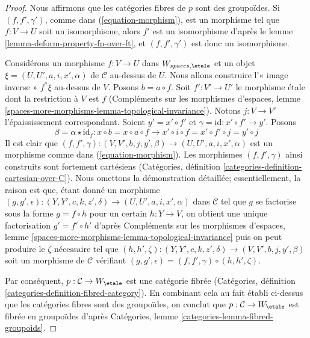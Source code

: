 \begin{proof}
Nous affirmons que les catégories fibres de $p$ sont des groupoïdes.
Si $(f, f', \gamma')$, comme dans (\ref{equation-morphism}),
est un morphisme tel que $f : V \to U$ soit un isomorphisme, alors
$f'$ est un isomorphisme d'après le lemme \ref{lemma-deform-property-fp-over-ft},
et $(f, f', \gamma')$ est donc un isomorphisme.

\medskip\noindent
Considérons un morphisme $f : V \to U$ dans $W_{spaces, \etale}$
et un objet $\xi = (U, U', a, i, x', \alpha)$
de $\mathcal{C}$ au-dessus de $U$. Nous allons construire l'« image inverse »
$f^*\xi$ au-dessus de $V$.
Posons $b = a \circ f$. Soit $f' : V' \to U'$ le morphisme \'etale
dont la restriction à $V$ est $f$ (Compléments sur les morphismes d'espaces,
lemme \ref{spaces-more-morphisms-lemma-topological-invariance}).
Notons $j : V \to V'$ l'épaississement correspondant.
Soient $y' = x' \circ f'$ et $\gamma = \text{id} : x' \circ f' \to y'$.
Posons
$$
\beta = \alpha \star \text{id}_f :
x \circ b = x \circ a \circ f \to
x' \circ i \circ f = x' \circ f' \circ j = y' \circ j
$$
Il est clair que $(f, f', \gamma) : (V, V', b, j, y', \beta) \to
(U, U', a, i, x', \alpha)$ est un morphisme comme dans
(\ref{equation-morphism}). Les morphismes $(f, f', \gamma)$
ainsi construits sont fortement cartésiens
(Catégories, définition \ref{categories-definition-cartesian-over-C}).
Nous omettons la démonstration détaillée; essentiellement, la raison est que,
étant donné un morphisme
$(g, g', \epsilon) : (Y, Y', c, k, z', \delta) \to (U, U', a, i, x', \alpha)$
dans $\mathcal{C}$ tel que $g$ se factorise sous la forme $g = f \circ h$ pour un certain
$h : Y \to V$, on obtient une unique factorisation $g' = f' \circ h'$
d'après Compléments sur les morphismes d'espaces,
lemme \ref{spaces-more-morphisms-lemma-topological-invariance}
puis on peut produire le $\zeta$ nécessaire tel que
$(h, h', \zeta) :  (Y, Y', c, k, z', \delta) \to
(V, V', b, j, y', \beta)$ soit un morphisme de $\mathcal{C}$
vérifiant $(g, g', \epsilon) = (f, f', \gamma) \circ (h, h', \zeta)$.

\medskip\noindent
Par conséquent, $p : \mathcal{C} \to W_\etale$ est une catégorie
fibrée (Catégories, définition \ref{categories-definition-fibred-category}).
En combinant cela au fait établi ci-dessus que les catégories fibres sont des groupoïdes,
on conclut que $p : \mathcal{C} \to W_\etale$ est
fibrée en groupoïdes d'après Catégories, lemme
\ref{categories-lemma-fibred-groupoids}.
\end{proof}

